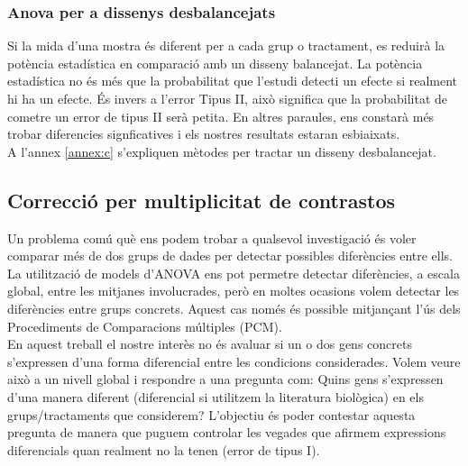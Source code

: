 \documentclass[english]{article}
\begin{document}
\subsubsection{Anova per a dissenys desbalancejats}
Si la mida d'una mostra és diferent per a cada grup o tractament, es reduirà la potència estadística en comparació amb un disseny balancejat. La potència estadística no és més que la probabilitat que l'estudi detecti un efecte si realment hi ha un efecte. És invers a l'error Tipus II, això significa que la probabilitat de cometre un error de tipus II serà petita. En altres paraules, ens constarà més trobar diferencies signficatives i els nostres resultats estaran esbiaixats.
\\
A l'annex \ref{annex:c} s'expliquen mètodes per tractar un disseny desbalancejat.
\subsection{Correcció per multiplicitat de contrastos}
Un problema comú què ens podem trobar a qualsevol investigació és voler comparar més de dos grups de dades per detectar possibles diferències entre ells. La utilització de models d'ANOVA ens pot permetre detectar diferències, a escala global, entre les mitjanes involucrades, però en moltes ocasions volem detectar les diferències entre grups concrets. Aquest cas només és possible mitjançant l'ús dels Procediments de Comparacions múltiples (PCM).
\\

En aquest treball el nostre interès no és avaluar si un o dos gens concrets s'expressen d'una forma diferencial entre les condicions considerades. Volem veure això a un nivell global i respondre a una pregunta com: Quins gens s'expressen d'una manera diferent (diferencial si utilitzem la literatura biològica) en els grups/tractaments que considerem? L'objectiu és poder contestar aquesta pregunta de manera que puguem controlar les vegades que afirmem expressions diferencials quan realment no la tenen (error de tipus I).
\\
\end{document}
